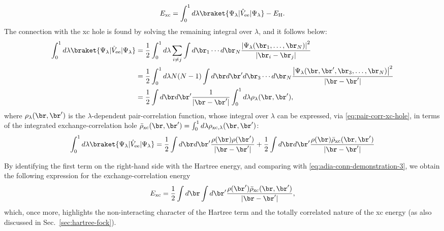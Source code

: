 %
\begin{equation}
    E_{\rm xc} = \int_0^1 d\lambda \braket{\Psi_{\lambda} | \hat{V}_{\rm ee} | \Psi_{\lambda}} - E_{\rm H} .
    \label{eq:adia-conn-demonstration-3}
\end{equation}
%
The connection with the xc hole is found by solving the remaining integral over $\lambda$, and it follows below:
%
\begin{equation}
    \begin{split}
    \int_0^1 d\lambda \braket{\Psi_{\lambda} | \hat{V}_{\rm ee} | \Psi_{\lambda}} &= \frac{1}{2} \int_0^1 d\lambda \sum_{i \neq j} \int d\br_1 \cdots d\br_N \frac{\left|\Psi_{\lambda}(\br_1, \dots, \br_N)\right|^2}{|\br_i - \br_j|} \\
    &= \frac{1}{2} \int_0^1 d\lambda N(N-1) \int d\br d\br' d\br_3 \cdots d\br_N \frac{\left|\Psi_{\lambda}(\br, \br', \br_3, \dots, \br_N)\right|^2}{|\br - \br'|} \\
    &= \frac{1}{2} \int d\br d\br' \frac{1}{|\br - \br'|} \int_0^1 d\lambda \rho_{\lambda}(\br,\br') ,
    \end{split}
    \label{eq:adia-conn-demonstration-4}
\end{equation}
%
where $\rho_{\lambda}(\br,\br')$ is the $\lambda$-dependent pair-correlation function, whose integral over $\lambda$ can be expressed, via \cref{eq:pair-corr-xc-hole}, in terms of the integrated exchange-correlation hole $\Bar{\rho}_{\rm xc}(\br,\br') = \int_0^1 d\lambda \rho_{\rm xc,\lambda}(\br,\br')$:
%
\begin{equation}
    \int_0^1 d\lambda \braket{\Psi_{\lambda} | \hat{V}_{\rm ee} | \Psi_{\lambda}} = \frac{1}{2} \int d\br d\br' \frac{\rho(\br) \rho(\br')}{|\br - \br'|} + \frac{1}{2} \int d\br d\br' \frac{\rho(\br) \Bar{\rho}_{\rm xc}(\br,\br')}{|\br - \br'|}
    \label{eq:adia-conn-demonstration-5}
\end{equation}

By identifying the first term on the right-hand side with the Hartree energy, and comparing with 
\cref{eq:adia-conn-demonstration-3}, we obtain the following expression for the exchange-correlation energy
%
\begin{equation}
    E_{\rm xc} = \frac{1}{2} \int d\br \int d\br' \frac{\rho(\br')\Bar{\rho}_{\rm xc}(\br,\br')}{|\br-\br'|} ,
    \label{eq:xc-ene-xc-hole}
\end{equation}
%
which, once more, highlights the non-interacting character of the Hartree term and the totally correlated nature of the xc energy (as also discussed in Sec.~\ref{sec:hartree-fock}).

